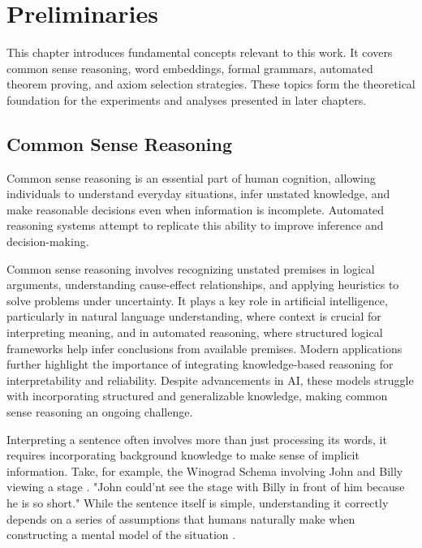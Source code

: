 \documentclass[english,version-2020-11]{uzl-thesis}
\begin{document}

\chapter{Preliminaries}
\label{chapter-preliminaries}

This chapter introduces fundamental concepts relevant to this work. It covers common sense reasoning, word embeddings, formal grammars, automated theorem proving, and axiom selection strategies. These topics form the theoretical foundation for the experiments and analyses presented in later chapters.

\section{Common Sense Reasoning}

Common sense reasoning is an essential part of human cognition, allowing individuals to understand everyday situations, infer unstated knowledge, and make reasonable decisions even when information is incomplete. Automated reasoning systems attempt to replicate this ability to improve inference and decision-making.

Common sense reasoning involves recognizing unstated premises in logical arguments, understanding cause-effect relationships, and applying heuristics to solve problems under uncertainty. It plays a key role in artificial intelligence, particularly in natural language understanding, where context is crucial for interpreting meaning, and in automated reasoning, where structured logical frameworks help infer conclusions from available premises. Modern applications further highlight the importance of integrating knowledge-based reasoning for interpretability and reliability. Despite advancements in AI, these models struggle with incorporating structured and generalizable knowledge, making common sense reasoning an ongoing challenge.

Interpreting a sentence often involves more than just processing its words, it requires incorporating background knowledge to make sense of implicit information. Take, for example, the Winograd Schema involving John and Billy viewing a stage \cite{Levesque2012}. 
"John could'nt see the stage with Billy in front of him because he is so short."
While the sentence itself is simple, understanding it correctly depends on a series of assumptions that humans naturally make when constructing a mental model of the situation \cite{Bayerkuhnlein2023}.
\end{document}
